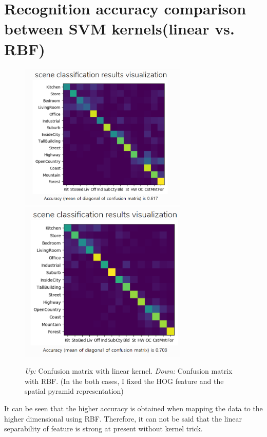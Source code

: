 \section*{Recognition accuracy comparison between SVM kernels(linear vs. RBF)}
\begin{figure}[h]
    \centering
    \includegraphics[width=8cm]{confulinear.png}
    \includegraphics[width=8cm]{confubest.png}
    \caption{\emph{Up:} Confusion matrix with linear kernel. \emph{Down:} Confusion matrix with RBF. (In the both cases, I fixed the HOG feature and the spatial pyramid representation)}
    \label{fig:result1}
\end{figure}

It can be seen that the higher accuracy is obtained when mapping the data to the higher dimensional using RBF. Therefore, it can not be said that the linear separability of feature is strong at present without kernel trick.

\pagebreak
